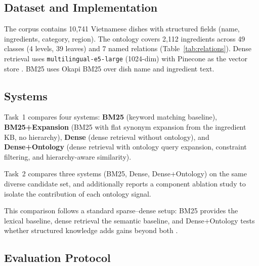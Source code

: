 \label{sec:experiments}

\subsection{Dataset and Implementation}

The corpus contains 10{,}741 Vietnamese dishes with structured fields (name, ingredients, category, region). The ontology covers 2{,}112 ingredients across 49 classes (4 levels, 39 leaves) and 7 named relations (Table~\ref{tab:relations}). Dense retrieval uses \texttt{multilingual-e5-large} (1024-dim) with Pinecone as the vector store \cite{wang2024multilinguale5}. BM25 uses Okapi BM25 over dish name and ingredient text.

\subsection{Systems}

Task~1 compares four systems: \textbf{BM25} (keyword matching 
baseline), \textbf{BM25+Expansion} (BM25 with flat synonym expansion from the ingredient KB, no hierarchy), \textbf{Dense} (dense retrieval without ontology), and \textbf{Dense+Ontology} 
(dense retrieval with ontology query expansion, constraint filtering, and hierarchy-aware similarity).

Task~2 compares three systems (BM25, Dense, Dense+Ontology) on the same diverse candidate set, and additionally reports a component ablation study to isolate the contribution of each ontology signal.

This comparison follows a standard sparse--dense setup: BM25 provides the lexical baseline, dense retrieval the semantic baseline, and Dense+Ontology tests whether structured knowledge 
adds gains beyond both \cite{robertson2009probabilistic, 
karpukhin2020dense, thakur2021beir}.
\subsection{Evaluation Protocol}
\label{ssec:eval_protocol}

